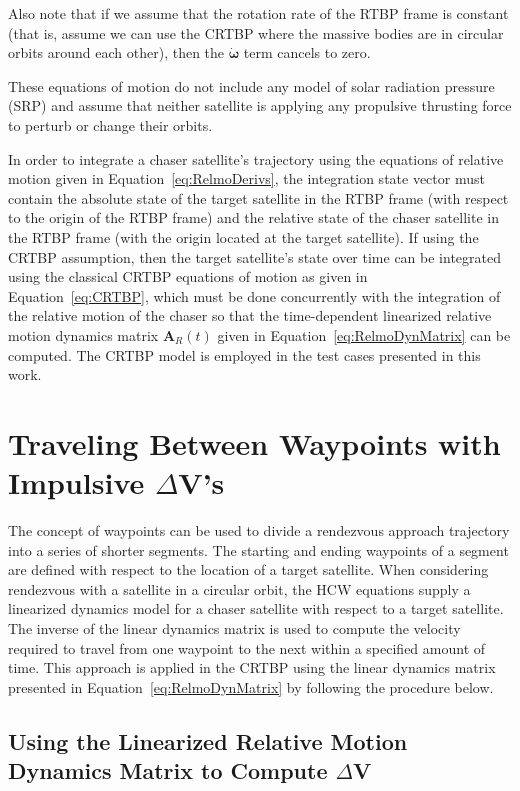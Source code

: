 \documentclass[letterpaper, preprint, paper,11pt]{AAS}	%
\begin{document}
Also note that if we assume that the rotation rate of the RTBP frame is constant (that is, assume we can use the CRTBP where the massive bodies are in circular orbits around each other), then the \(\boldsymbol{\dot{\omega}}\) term cancels to zero.

These equations of motion do not include any model of solar radiation pressure (SRP) and assume that neither satellite is applying any propulsive thrusting force to perturb or change their orbits. 

In order to integrate a chaser satellite's trajectory using the equations of relative motion given in Equation~\eqref{eq:RelmoDerivs}, the integration state vector must contain the absolute state of the target satellite in the RTBP frame (with respect to the origin of the RTBP frame) and the relative state of the chaser satellite in the RTBP frame (with the origin located at the target satellite).  If using the CRTBP assumption, then the target satellite's state over time can be integrated using the classical CRTBP equations of motion as given in Equation~\eqref{eq:CRTBP}, which must be done concurrently with the integration of the relative motion of the chaser so that the time-dependent linearized relative motion dynamics matrix \(\mathbf{A}_R(t)\) given in Equation~\eqref{eq:RelmoDynMatrix} can be computed. The CRTBP model is employed in the test cases presented in this work.

\section{Traveling Between Waypoints with Impulsive $\Delta$V's}
The concept of waypoints can be used to divide a rendezvous approach trajectory into a series of shorter segments.  The starting and ending waypoints of a segment are defined with respect to the location of a target satellite.  When considering rendezvous with a satellite in a circular orbit, the HCW equations supply a linearized dynamics model for a chaser satellite with respect to a target satellite.  The inverse of the linear dynamics matrix is used to compute the velocity required to travel from one waypoint to the next within a specified amount of time.  This approach is applied in the CRTBP using the linear dynamics matrix presented in Equation~\eqref{eq:RelmoDynMatrix} by following the procedure below. 

\subsection{Using the Linearized Relative Motion Dynamics Matrix to Compute \(\Delta\)V}
\end{document}
